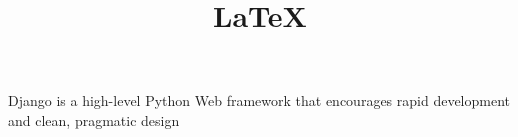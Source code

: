 \documentclass[14pt]{article}
\title{\LaTeX}
\date{}
\begin{document}
  \maketitle 
  Django is a high-level Python Web framework that encourages rapid development and clean, pragmatic design
\end{document}
